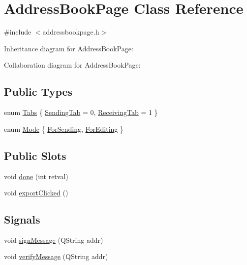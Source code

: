 \hypertarget{class_address_book_page}{}\section{Address\+Book\+Page Class Reference}
\label{class_address_book_page}


{\ttfamily \#include $<$addressbookpage.\+h$>$}



Inheritance diagram for Address\+Book\+Page\+:


Collaboration diagram for Address\+Book\+Page\+:
\subsection*{Public Types}
\begin{DoxyCompactItemize}
\item 
enum \hyperlink{class_address_book_page_a7ef3cf6c3e4613894af313a05335dbe3}{Tabs} \{ \hyperlink{class_address_book_page_a7ef3cf6c3e4613894af313a05335dbe3a0317158231d27f7965037521fea1998d}{Sending\+Tab} = 0, 
\hyperlink{class_address_book_page_a7ef3cf6c3e4613894af313a05335dbe3ac0029a5d46e35919fb2df9c4f370e8a9}{Receiving\+Tab} = 1
 \}
\item 
enum \hyperlink{class_address_book_page_a0a8f8e590dc6f18e829fde039f984464}{Mode} \{ \hyperlink{class_address_book_page_a0a8f8e590dc6f18e829fde039f984464a3591dbaa5496b5791059d7df5d293a1c}{For\+Sending}, 
\hyperlink{class_address_book_page_a0a8f8e590dc6f18e829fde039f984464a86b6565fcddce6edf578c0e470471296}{For\+Editing}
 \}
\end{DoxyCompactItemize}
\subsection*{Public Slots}
\begin{DoxyCompactItemize}
\item 
void \hyperlink{class_address_book_page_a4f585f3ff33a3c7066b2fcda803f862f}{done} (int retval)
\item 
void \hyperlink{class_address_book_page_ae5b20525c7f1cf805eace9aafe308d42}{export\+Clicked} ()
\end{DoxyCompactItemize}
\subsection*{Signals}
\begin{DoxyCompactItemize}
\item 
void \hyperlink{class_address_book_page_a5a5258459403cb0e841d50e4c6bb6f3b}{sign\+Message} (Q\+String addr)
\item 
void \hyperlink{class_address_book_page_a6050d81accc38fd0e3c469002ea3142f}{verify\+Message} (Q\+String addr)
\end{DoxyCompactItemize}
